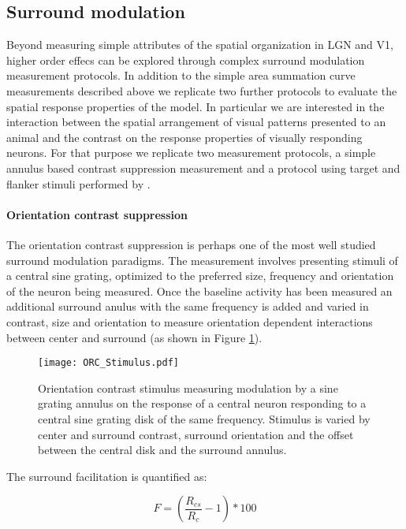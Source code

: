 \subsection{Surround modulation}

Beyond measuring simple attributes of the spatial organization in LGN
and V1, higher order effecs can be explored through complex surround
modulation measurement protocols. In addition to the simple area
summation curve measurements described above we replicate two further
protocols to evaluate the spatial response properties of the model.
In particular we are interested in the interaction between the spatial
arrangement of visual patterns presented to an animal and the contrast
on the response properties of visually responding neurons. For that
purpose we replicate two measurement protocols, a simple annulus based
contrast suppression measurement \cite{Jones2002} and a protocol using
target and flanker stimuli performed by \cite{Kapadia1995}.

\paragraph{Orientation contrast suppression}

The orientation contrast suppression is perhaps one of the most well
studied surround modulation paradigms. The measurement involves
presenting stimuli of a central sine grating, optimized to the
preferred size, frequency and orientation of the neuron being
measured. Once the baseline activity has been measured an additional
surround anulus with the same frequency is added and varied in
contrast, size and orientation to measure orientation dependent
interactions between center and surround (as shown in Figure
\ref{ORC_Stimulus}).

\begin{figure}
	\centering
        \texttt{[image: ORC\_Stimulus.pdf]}
	\caption{Orientation contrast stimulus measuring modulation by a
      sine grating annulus on the response of a central neuron
      responding to a central sine grating disk of the same frequency.
      Stimulus is varied by center and surround contrast, surround
      orientation and the offset between the central disk and the
      surround annulus.}
	\label{ORC_Stimulus}
\end{figure}

The surround facilitation is quantified as:

\begin{equation}
F = (\frac{R_{cs}}{R_c} - 1) * 100
\end{equation}


